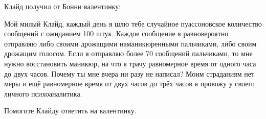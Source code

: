 \documentclass[12pt]{article}
\let\P\relax
\DeclareMathOperator{\P}{\mathbb{P}}
\begin{document}
% 
%



\vspace*{2cm}

    Клайд получил от Бонни валентинку:

\vspace*{1cm}
 
Мой милый Клайд, каждый день я шлю тебе случайное пуассоновское количество сообщений с ожиданием 100 штук.  
Каждое сообщение я равновероятно отправляю либо своими дрожащими на\-ма\-ни\-кюренными пальчиками, либо своим дрожащим голосом. 
Если я отправляю более 70 сообщений пальчиками, 
то мне нужно восстановить маникюр, на что я трачу равномерное время от одного часа до двух часов. Почему ты мне вчера ни разу не написал?
Моим страданиям нет меры и ещё равномерное время от двух часов до трёх часов я провожу у своего личного психоаналитика. 

    

\vspace*{1cm}

Помогите Клайду ответить на валентинку. 
\end{document}
